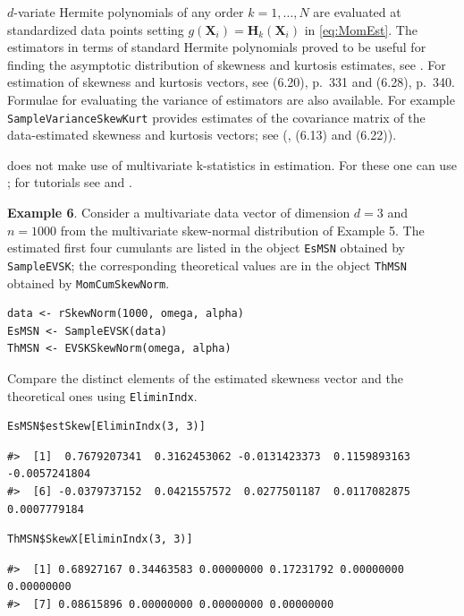 \(d\)-variate Hermite polynomials of any order \(k=1, \dots, N\) are evaluated at standardized data points setting \(g(\mathbf{X}_i)=\mathbf{H}_k(\mathbf{X}_i)\) in \eqref{eq:MomEst}. The estimators in terms of standard Hermite polynomials proved to be useful for finding the asymptotic distribution of skewness and kurtosis estimates, see \citet{jamma2021SJS}. For estimation of skewness and kurtosis vectors, see \citet{terdik2021multivariate} (6.20), p.~331 and (6.28), p.~340. Formulae for evaluating the variance of estimators are also available. For example \texttt{SampleVarianceSkewKurt} provides estimates of the covariance matrix of the data-estimated skewness and kurtosis vectors; see (\citet{terdik2021multivariate}, (6.13) and (6.22)).

 does not make use of multivariate k-statistics in estimation. For these one can use ; for tutorials see \citet{dinardo22b} and \citet{smith2020tutorial}.

\textbf{Example 6}. Consider a multivariate data vector of dimension \(d=3\) and \(n=1000\) from the multivariate skew-normal distribution of Example 5. The estimated first four cumulants are listed in the object \texttt{EsMSN} obtained by \texttt{SampleEVSK}; the corresponding theoretical values are in the object \texttt{ThMSN} obtained by \texttt{MomCumSkewNorm}.

\begin{verbatim}
data <- rSkewNorm(1000, omega, alpha)
EsMSN <- SampleEVSK(data)
ThMSN <- EVSKSkewNorm(omega, alpha)
\end{verbatim}

Compare the distinct elements of the estimated skewness vector and the theoretical ones using \texttt{EliminIndx}.

\begin{verbatim}
EsMSN$estSkew[EliminIndx(3, 3)]
\end{verbatim}

\begin{verbatim}
#>  [1]  0.7679207341  0.3162453062 -0.0131423373  0.1159893163 -0.0057241804
#>  [6] -0.0379737152  0.0421557572  0.0277501187  0.0117082875  0.0007779184
\end{verbatim}

\begin{verbatim}
ThMSN$SkewX[EliminIndx(3, 3)]
\end{verbatim}

\begin{verbatim}
#>  [1] 0.68927167 0.34463583 0.00000000 0.17231792 0.00000000 0.00000000
#>  [7] 0.08615896 0.00000000 0.00000000 0.00000000
\end{verbatim}

